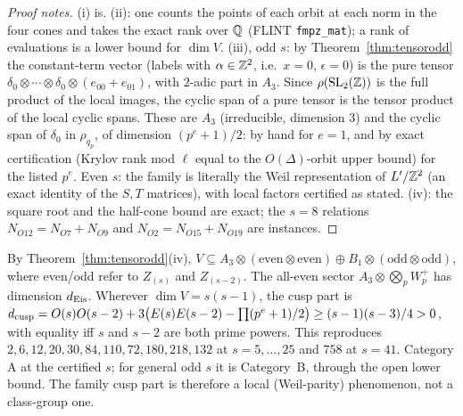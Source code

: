\begin{proof}[Proof notes]
(i) is. (ii): one counts the points of each orbit at each norm in the four cones and takes the exact rank over $\mathbb{Q}$ (FLINT
\texttt{fmpz\_mat}); a rank of evaluations is a lower bound for $\dim V$. (iii), odd $s$: by
Theorem~\ref{thm:tensorodd} the constant-term vector (labels with $\alpha\in\mathbb{Z}^2$, i.e.\ $x=0$, $\epsilon=0$) is the pure tensor
$\delta_0\otimes\cdots\otimes\delta_0\otimes(e_{00}+e_{01})$, with $2$-adic part in $A_3$. Since $\rho(\mathrm{SL}_2(\mathbb{Z}))$ is the full product of the local images,
the cyclic span of a pure tensor is the tensor product of the local cyclic spans. These are $A_3$ (irreducible, dimension $3$) and the cyclic span of $\delta_0$
in $\rho_{q_p}$, of dimension $(p^e+1)/2$: by hand for $e=1$, and by exact certification (Krylov rank mod $\ell$ equal to the $O(\Delta)$-orbit upper bound)
for the listed $p^e$. Even $s$: the family is
literally the Weil representation of $L'/\mathbb{Z}^2$ (an exact identity of the $S,T$ matrices), with local factors certified as stated. (iv): the square root
and the half-cone bound are exact; the $s=8$ relations $N_{O12}=N_{O7}+N_{O9}$ and $N_{O2}=N_{O15}+N_{O19}$ are instances.
\end{proof}

\begin{remark}
By Theorem~\ref{thm:tensorodd}(iv), $V\subseteq A_3\otimes(\text{even}\otimes\text{even})\oplus B_1\otimes(\text{odd}\otimes\text{odd})$, where even/odd refer to $Z_{(s)}$ and $Z_{(s-2)}$.
The all-even sector $A_3\otimes\bigotimes_pW_p^+$ has dimension $d_{\rm Eis}$. Wherever $\dim V=s(s-1)$, the cusp part is
$d_{\rm cusp}=O(s)O(s-2)+3\bigl(E(s)E(s-2)-\prod(p^e+1)/2\bigr)\ge(s-1)(s-3)/4>0$, with equality iff $s$ and $s-2$ are both prime powers. This reproduces
$2,6,12,20,30,84,110,72,180,218,132$ at $s=5,\dots,25$ and $758$ at $s=41$. Category A at the certified $s$; for general odd $s$
it is Category~B, through the open lower bound. The family cusp part is therefore a local (Weil-parity) phenomenon, not a class-group one.
\end{remark}

